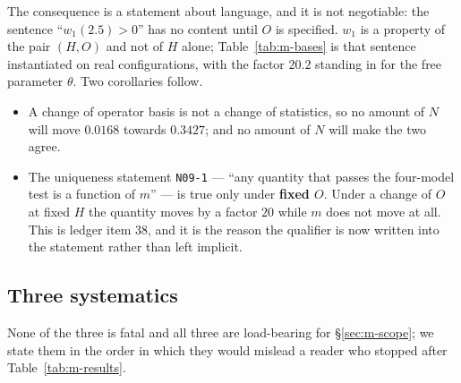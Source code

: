 The consequence is a statement about language, and it is not negotiable: the sentence
``$w_1(2.5)>0$'' has no content until $O$ is specified. $w_1$ is a property of the pair $(H,O)$ and
not of $H$ alone; Table~\ref{tab:m-bases} is that sentence instantiated on real configurations, with
the factor $20.2$ standing in for the free parameter $\theta$. Two corollaries follow.
\begin{itemize}
\item A change of operator basis is not a change of statistics, so no amount of $N$ will move
  $0.0168$ towards $0.3427$; and no amount of $N$ will make the two agree.
\item The uniqueness statement \texttt{N09-1} --- ``any quantity that passes the four-model test is a
  function of $m$'' --- is true only under \textbf{fixed $O$}. Under a change of $O$ at fixed $H$ the
  quantity moves by a factor $20$ while $m$ does not move at all. This is ledger item $38$, and it is
  the reason the qualifier is now written into the statement rather than left implicit. \LC{}
\end{itemize}

\subsection{Three systematics}
\label{sec:m-syst}

None of the three is fatal and all three are load-bearing for \S\ref{sec:m-scope}; we state them in
the order in which they would mislead a reader who stopped after Table~\ref{tab:m-results}.

